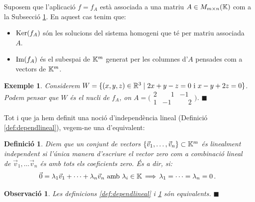 \documentclass[
  11pt,
]{book}
\numberwithin{dummy}{section}
\theoremstyle{maincolornumbox}
\newtheorem{remarkT}{Observació}[chapter]
\theoremstyle{blacknumex}
\newtheorem{exampleT}{Exemple}[chapter]
\theoremstyle{blacknumbox}
\newtheorem{definitionT}{Definició}[chapter]
\theoremstyle{maincolornum}
\newenvironment{definition}{\begin{dBox}\begin{definitionT}}{\end{definitionT}\end{dBox}}
\newenvironment{example}{\begin{exampleT}}{\hfill{\tiny\ensuremath{\blacksquare}}\end{exampleT}}
\newenvironment{remark}{\begin{remarkT}}{\hfill{\tiny\ensuremath{\blacksquare}}\end{remarkT}}
\newlength\esp
\begin{document}
Suposem que l'aplicació \(f=f_A\) està associada a una matriu
\(A\in M_{m\times n}(\mathbb{K})\) com a la Subsecció
\protect\hyperlink{subsec:matriusapl}{1}. En aquest cas tenim que:

\begin{itemize}
\item
  \(\operatorname{Ker}(f_A)\) són les solucions del sistema homogeni que té per matriu
  associada \(A\).
\item
  \(\operatorname{Im}(f_A)\) és el subespai de \(\mathbb{K}^m\) generat per les columnes d'\(A\)
  pensades com a vectors de \(\mathbb{K}^m\).
\end{itemize}

\begin{example}
Considerem \(W=\{(x,y,z)\in\mathbb{R}^3 \mid 2x+y-z=0 \text{ i } x -y +2z=0\}\).
Podem pensar que \(W\) és el nucli de \(f_A\), on
\(A=\big(\begin{smallmatrix} 2 & \phantom{-}1 & -1 \\ 1 & -1 & \phantom{-}2\end{smallmatrix}\big)\).
\end{example}

Tot i que ja hem definit una noció d'independència lineal (Definició
\ref{def:dependlineal}), vegem-ne una d'equivalent:

\begin{definition}
\protect\hypertarget{def:indeplin}{}\label{def:indeplin}Diem que un conjunt de vectors
\(\{\vec v_1, \dots , \vec v_n\} \subset \mathbb{K}^m\) és \emph{linealment
independent} si l'única manera d'escriure el vector zero com a
combinació lineal de \(\vec v_1, \dots \vec v_n\) és amb tots els
coeficients zero. És a dir, si:
\[\vec 0 = \lambda_1 \vec v_1+\cdots +\lambda_n\vec v_n \text{ amb $\lambda_i\in\mathbb{K}$} \, \Longrightarrow \, \lambda_1=\cdots =\lambda_n=0 \,.\]
\end{definition}

\begin{remark}
Les definicions
\ref{def:dependlineal} i
\ref{def:indeplin} són equivalents.
\end{remark}
\end{document}
